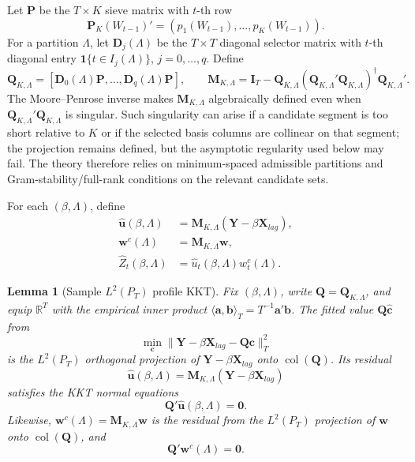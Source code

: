 \documentclass[12pt]{article}
\numberwithin{equation}{section}
\newtheorem{lemma}{Lemma}
\theoremstyle{definition}
\newcommand{\ind}{\mathbf 1}
\begin{document}
Let \(\bm P\) be the \(T\times K\) sieve matrix with \(t\)-th row
\[
    \bm P_K(W_{t-1})'=(p_1(W_{t-1}),\ldots,p_K(W_{t-1})).
\]
For a partition \(\Lambda\), let \(\bm D_j(\Lambda)\) be the \(T\times T\) diagonal selector matrix with \(t\)-th diagonal entry \(\ind\{t\in I_j(\Lambda)\}\), \(j=0,\ldots,q\). Define
\begin{equation}
    \bm Q_{K,\Lambda}
    =
    [\bm D_0(\Lambda)\bm P,\ldots,\bm D_q(\Lambda)\bm P],
    \qquad
    \bm M_{K,\Lambda}
    =
    \bm I_T-\bm Q_{K,\Lambda}
    (\bm Q_{K,\Lambda}'\bm Q_{K,\Lambda})^\dagger
    \bm Q_{K,\Lambda}'.
    \label{eq:primitive-qm}
\end{equation}
The Moore--Penrose inverse makes \(\bm M_{K,\Lambda}\) algebraically defined even when \(\bm Q_{K,\Lambda}'\bm Q_{K,\Lambda}\) is singular. Such singularity can arise if a candidate segment is too short relative to \(K\) or if the selected basis columns are collinear on that segment; the projection remains defined, but the asymptotic regularity used below may fail. The theory therefore relies on minimum-spaced admissible partitions and Gram-stability/full-rank conditions on the relevant candidate sets.

For each \((\beta,\Lambda)\), define
\begin{align}
    \widehat{\bm u}(\beta,\Lambda)
    &=
    \bm M_{K,\Lambda}(\bm Y-\beta\bm X_{lag}),
    \\
    \bm w^c(\Lambda)
    &=
    \bm M_{K,\Lambda}\bm w,
    \\
    \widehat Z_t(\beta,\Lambda)
    &=
    \widehat u_t(\beta,\Lambda)w_t^c(\Lambda).
\end{align}

\begin{lemma}[Sample \(L^2(P_T)\) profile KKT]
\label{lem:sample-l2pt-profile-kkt}
Fix \((\beta,\Lambda)\), write \(\bm Q=\bm Q_{K,\Lambda}\), and equip
\(\mathbb R^T\) with the empirical inner product
\(\langle \bm a,\bm b\rangle_T=T^{-1}\bm a'\bm b\). The fitted value
\(\bm Q\widehat{\bm c}\) from
\[
    \min_{\bm c}\|\bm Y-\beta\bm X_{lag}-\bm Q\bm c\|_T^2
\]
is the \(L^2(P_T)\) orthogonal projection of \(\bm Y-\beta\bm X_{lag}\) onto
\(\operatorname{col}(\bm Q)\). Its residual
\[
    \widehat{\bm u}(\beta,\Lambda)
    =\bm M_{K,\Lambda}(\bm Y-\beta\bm X_{lag})
\]
satisfies the KKT normal equations
\[
    \bm Q'\widehat{\bm u}(\beta,\Lambda)=\bm0.
\]
Likewise, \(\bm w^c(\Lambda)=\bm M_{K,\Lambda}\bm w\) is the residual from the
\(L^2(P_T)\) projection of \(\bm w\) onto \(\operatorname{col}(\bm Q)\), and
\[
    \bm Q'\bm w^c(\Lambda)=\bm0.
\]
\end{lemma}
\end{document}
